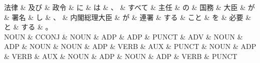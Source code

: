 \documentclass[tikz,border=5pt]{standalone}
\begin{document}
\normalsize
\begin{dependency}[edge unit distance=12.0pt]
    \begin{deptext}[column sep=1em]
        法律 \& 及び \& 政令 \& に \& は \& 、 \& すべて \& 主任 \& の \& 国務 \& 大臣 \& が \& 署名 \& し \& 、 \& 内閣総理大臣 \& が \& 連署 \& する \& こと \& を \& 必要 \& と \& する \& 。\\
        NOUN \& CCONJ \& NOUN \& ADP \& ADP \& PUNCT \& ADV \& NOUN \& ADP \& NOUN \& NOUN \& ADP \& VERB \& AUX \& PUNCT \& NOUN \& ADP \& VERB \& AUX \& NOUN \& ADP \& NOUN \& ADP \& VERB \& PUNCT\\
    \end{deptext}
\end{dependency}
\end{document}
